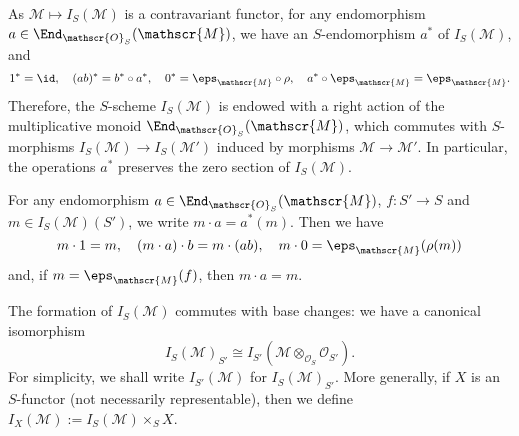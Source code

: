 As $\mathscr{M}\mapsto I_S(\mathscr{M})$ is a contravariant functor, for any endomorphism $a\in\End_{\mathscr{O}_S}(\mathscr{M})$, we have an $S$-endomorphism $a^*$ of $I_S(\mathscr{M})$, and
\[1^*=\id,\quad (ab)^*=b^*\circ a^*,\quad 0^*=\eps_\mathscr{M}\circ\rho,\quad a^*\circ\eps_\mathscr{M}=\eps_\mathscr{M}.\]
Therefore, the $S$-scheme $I_S(\mathscr{M})$ is endowed with a right action of the multiplicative monoid $\End_{\mathscr{O}_S}(\mathscr{M})$, which commutes with $S$-morphisms $I_S(\mathscr{M})\to I_S(\mathscr{M}')$ induced by morphisms $\mathscr{M}\to\mathscr{M}'$. In particular, the operations $a^*$ preserves the zero section of $I_S(\mathscr{M})$.\par
For any endomorphism $a\in\End_{\mathscr{O}_S}(\mathscr{M})$, $f:S'\to S$ and $m\in I_S(\mathscr{M})(S')$, we write $m\cdot a=a^*(m)$. Then we have
\[m\cdot 1=m,\quad (m\cdot a)\cdot b=m\cdot(ab),\quad m\cdot 0=\eps_\mathscr{M}(\rho(m))\]
and, if $m=\eps_\mathscr{M}(f)$, then $m\cdot a=m$.

\begin{remark}
The formation of $I_S(\mathscr{M})$ commutes with base changes: we have a canonical isomorphism
\[I_S(\mathscr{M})_{S'}\cong I_{S'}(\mathscr{M}\otimes_{\mathscr{O}_S}\mathscr{O}_{S'}).\]
For simplicity, we shall write $I_{S'}(\mathscr{M})$ for $I_S(\mathscr{M})_{S'}$. More generally, if $X$ is an $S$-functor (not necessarily representable), then we define $I_X(\mathscr{M}):=I_S(\mathscr{M})\times_SX$.
\end{remark}

